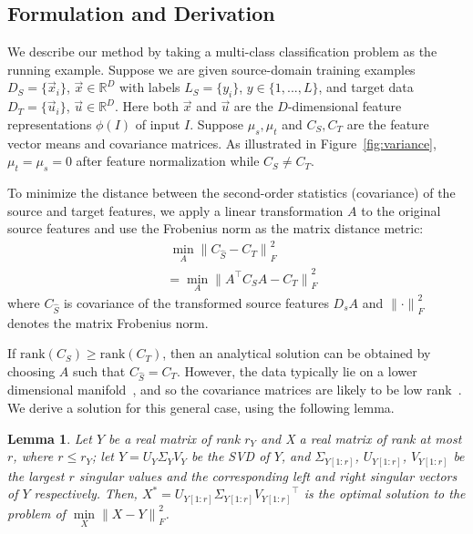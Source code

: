 \documentclass[letterpaper]{article}
\newtheorem{lemma}{Lemma}
\newcommand{\xSrc}{\vec{x}}
\newcommand{\ySrc}{y}
\newcommand{\xTar}{\vec{u}}
\begin{document}
\subsection{Formulation and Derivation}
We describe our method by taking a multi-class classification problem as the running example. Suppose we are given source-domain training examples $D_S=\{\xSrc_i\}$, $\xSrc\in\mathbb{R}^D$ with labels $L_S=\{\ySrc_i\}$, $\ySrc \in\{1,...,L\}$, and target data $D_T=\{\xTar_i\}$, $\xTar \in \mathbb{R}^D$. Here both $\xSrc$ and $\xTar$ are the $D$-dimensional feature representations $\phi(I)$ of input $I$. Suppose $\mu_s,\mu_t$ and $C_{S}, C_{T}$ are the feature vector means and covariance matrices. As illustrated in Figure~\ref{fig:variance}, $\mu_t=\mu_s=0$ after feature normalization while $C_{S} \neq C_{T}$.

To minimize the distance between the second-order statistics (covariance) of the source and target features, we apply a linear transformation $A$ to the original source features and use the Frobenius norm as the matrix distance metric:
      \begin{equation}
      \begin{aligned}
      &~\underset{A}{\min} {\| C_{\hat{S}} - C_{T} \|}^2_F\\
      &= \underset{A}{\min} {\| A^{\top}C_{S}A - C_{T} \|}^2_F
      \end{aligned}
      \label{eq:obj}
      \end{equation}
where $C_{\hat{S}}$ is covariance of the transformed source features $D_sA$ and ${\|\cdot\|}^2_F$ denotes the matrix Frobenius norm. 

If $\mathrm{rank}(C_S) \geq \mathrm{rank}(C_T)$, then an analytical solution can be obtained by choosing $A$ such that $C_{\hat{S}}= C_{T}$.
However, the data typically lie on a lower dimensional manifold~\cite{outlooks,gfk,sasb}, and so the covariance matrices are likely to be low rank~\cite{who}. We derive a solution for this general case, using the following lemma.
\begin{lemma}\cite{SVT} 
\label{lemma:svt}
Let $Y$ be a real matrix of rank $r_Y$ and X a real matrix of rank at most $r$, where ${r}\leqslant{r_Y}$; let $Y={U_Y}{\Sigma_Y}{V_Y}$ be the SVD of $Y$, and ${\Sigma_{Y[1:r]}}$, $U_{Y[1:r]}$, $V_{Y[1:r]}$ be the largest $r$ singular values and the corresponding left and right singular vectors of $Y$ respectively. Then, $X^{*} = U_{Y[1:r]}{\Sigma_{Y[1:r]}}{V_{Y[1:r]}}^{\top}$ is the optimal solution to the problem of $\underset{X}\min{\| X - Y \|}^2_F$.
\end{lemma}
\end{document}
